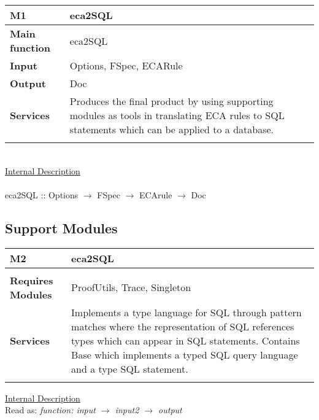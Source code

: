 \documentclass[12pt, svgnames]{article}
\begin{document}
{\setlength{\tabcolsep}{6pt} 
    \begin{tabularx}{\textwidth}{>{\bfseries}m{3cm}X}
        M1 & eca2SQL \\ 
        \midrule 
        Main function & eca2SQL
        \\  Input & Options, FSpec, ECARule
        \\  Output & Doc
        \\	Services & Produces the final product by using supporting modules 
        as tools in translating ECA rules to SQL statements which can be 
        applied to a database.
        \\     
         \vspace{12pt}
     \end{tabularx}
\\
\underline{Internal Description}\\ \\
eca2SQL :: Options $\rightarrow$ FSpec $\rightarrow$ ECArule $\rightarrow$ Doc

\subsection{Support Modules}

{\setlength{\tabcolsep}{6pt} 
    \begin{tabularx}{\textwidth}{>{\bfseries}m{4cm}X}
        M2 & eca2SQL \\ 
        \midrule       
        \\  Requires Modules & ProofUtils, Trace, Singleton
        \\	Services & Implements a type language for SQL through pattern 
        matches where the representation of SQL references types which can 
        appear in SQL statements. Contains Base which implements a typed SQL query 
        language and a type SQL statement.
        \\         
        \vspace{12pt}
    \end{tabularx} 


\setlength{\parindent}{0pt}
\underline{Internal Description}\\

Read as: \textit{function: input $\rightarrow$ input2 $\rightarrow$ 
output}\newline

}}
\end{document}
